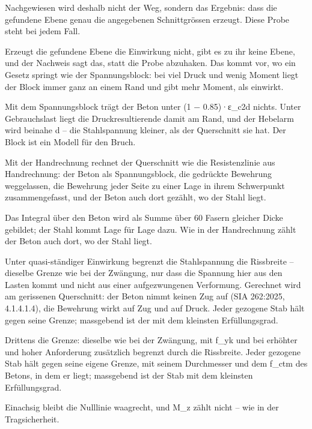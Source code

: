 \documentclass[11pt,a4paper]{article}
\begin{document}
Nachgewiesen wird deshalb nicht der Weg, sondern das Ergebnis: dass die gefundene Ebene genau die angegebenen Schnittgrössen erzeugt. Diese Probe steht bei jedem Fall.

Erzeugt die gefundene Ebene die Einwirkung nicht, gibt es zu ihr keine Ebene, und der Nachweis sagt das, statt die Probe abzuhaken. Das kommt vor, wo ein Gesetz springt wie der Spannungsblock: bei viel Druck und wenig Moment liegt der Block immer ganz an einem Rand und gibt mehr Moment, als einwirkt.

Mit dem Spannungsblock trägt der Beton unter (1 − 0.85)·ε\_c2d nichts. Unter Gebrauchslast liegt die Druckresultierende damit am Rand, und der Hebelarm wird beinahe d – die Stahlspannung kleiner, als der Querschnitt sie hat. Der Block ist ein Modell für den Bruch.

Mit der Handrechnung rechnet der Querschnitt wie die Resistenzlinie aus Handrechnung: der Beton als Spannungsblock, die gedrückte Bewehrung weggelassen, die Bewehrung jeder Seite zu einer Lage in ihrem Schwerpunkt zusammengefasst, und der Beton auch dort gezählt, wo der Stahl liegt.

Das Integral über den Beton wird als Summe über 60 Fasern gleicher Dicke gebildet; der Stahl kommt Lage für Lage dazu. Wie in der Handrechnung zählt der Beton auch dort, wo der Stahl liegt.

Unter quasi-ständiger Einwirkung begrenzt die Stahlspannung die Rissbreite – dieselbe Grenze wie bei der Zwängung, nur dass die Spannung hier aus den Lasten kommt und nicht aus einer aufgezwungenen Verformung. Gerechnet wird am gerissenen Querschnitt: der Beton nimmt keinen Zug auf (SIA 262:2025, 4.1.4.1.4), die Bewehrung wirkt auf Zug und auf Druck. Jeder gezogene Stab hält gegen seine Grenze; massgebend ist der mit dem kleinsten Erfüllungsgrad.

Drittens die Grenze: dieselbe wie bei der Zwängung, mit f\_yk und bei erhöhter und hoher Anforderung zusätzlich begrenzt durch die Rissbreite. Jeder gezogene Stab hält gegen seine eigene Grenze, mit seinem Durchmesser und dem f\_ctm des Betons, in dem er liegt; massgebend ist der Stab mit dem kleinsten Erfüllungsgrad.

Einachsig bleibt die Nulllinie waagrecht, und M\_z zählt nicht – wie in der Tragsicherheit.
\end{document}
